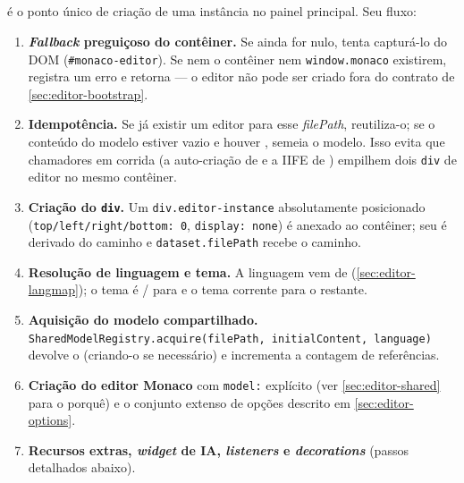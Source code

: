 \subsection{}
\label{sec:editor-create}

 é o ponto único de criação
de uma instância no painel principal. Seu fluxo:

\begin{enumerate}[leftmargin=*]
  \item \textbf{\emph{Fallback} preguiçoso do contêiner.} Se 
        ainda for nulo, tenta capturá-lo do DOM (\lstinline|#monaco-editor|). Se
        nem o contêiner nem \lstinline|window.monaco| existirem, registra um erro
        e retorna --- o editor não pode ser criado fora do contrato de
        \autoref{sec:editor-bootstrap}.
  \item \textbf{Idempotência.} Se já existir um editor para esse \emph{filePath},
        reutiliza-o; se o conteúdo do modelo estiver vazio e houver
        , semeia o modelo. Isso evita que chamadores em
        corrida (a auto-criação de  e a IIFE de
        ) empilhem dois \lstinline|div| de editor no mesmo
        contêiner.
  \item \textbf{Criação do \lstinline|div|.} Um \lstinline|div.editor-instance|
        absolutamente posicionado (\lstinline|top/left/right/bottom: 0|,
        \lstinline|display: none|) é anexado ao contêiner; seu  é
        derivado do caminho e \lstinline|dataset.filePath| recebe o caminho.
  \item \textbf{Resolução de linguagem e tema.} A linguagem vem de
         (\autoref{sec:editor-langmap}); o tema é
        / para \cmm{} e o tema corrente para o
        restante.
  \item \textbf{Aquisição do modelo compartilhado.}
        \lstinline|SharedModelRegistry.acquire(filePath, initialContent, language)|
        devolve o  (criando-o se necessário) e incrementa a
        contagem de referências.
  \item \textbf{Criação do editor Monaco} com \lstinline|model:| explícito (ver
        \autoref{sec:editor-shared} para o porquê) e o conjunto extenso de opções
        descrito em \autoref{sec:editor-options}.
  \item \textbf{Recursos extras, \emph{widget} de IA, \emph{listeners} e
        \emph{decorations}} (passos detalhados abaixo).
\end{enumerate}

